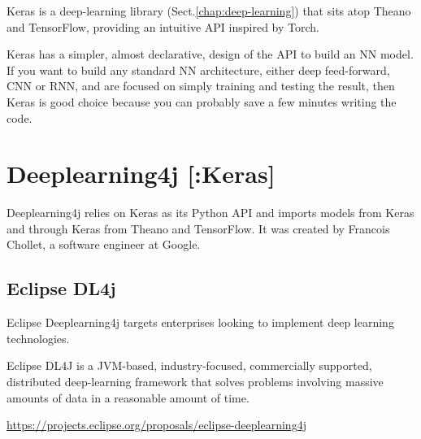 Keras is a deep-learning library (Sect.\ref{chap:deep-learning}) that sits atop
Theano and TensorFlow, providing an intuitive API inspired by Torch.

Keras has a simpler, almost declarative, design of the API to build an NN model.
If you want to build any standard NN architecture, either deep feed-forward, CNN
or RNN, and are focused on simply training and testing the result, then Keras is
good choice because you can probably save a few minutes writing the code. 

\chapter{Deeplearning4j [:Keras]}
\label{sec:Deeplearning4j}

Deeplearning4j relies on Keras as its Python API and imports models from Keras
and through Keras from Theano and TensorFlow. It was created by Francois
Chollet, a software engineer at Google. 



\section{Eclipse DL4j}
\label{sec:EclipseDL4j}

Eclipse Deeplearning4j targets enterprises looking to implement deep learning
technologies. 

Eclipse DL4J is a JVM-based, industry-focused, commercially supported,
distributed deep-learning framework that solves problems involving massive amounts of data
in a reasonable amount of time.

\url{https://projects.eclipse.org/proposals/eclipse-deeplearning4j}

